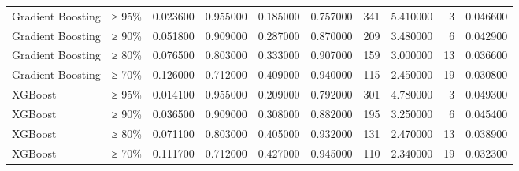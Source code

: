 \begin{table}
\begin{tabular}{llrrrrrrrr}
Gradient Boosting & ≥ 95\% & 0.023600 & 0.955000 & 0.185000 & 0.757000 & 341 & 5.410000 & 3 & 0.046600 \\
Gradient Boosting & ≥ 90\% & 0.051800 & 0.909000 & 0.287000 & 0.870000 & 209 & 3.480000 & 6 & 0.042900 \\
Gradient Boosting & ≥ 80\% & 0.076500 & 0.803000 & 0.333000 & 0.907000 & 159 & 3.000000 & 13 & 0.036600 \\
Gradient Boosting & ≥ 70\% & 0.126000 & 0.712000 & 0.409000 & 0.940000 & 115 & 2.450000 & 19 & 0.030800 \\
XGBoost & ≥ 95\% & 0.014100 & 0.955000 & 0.209000 & 0.792000 & 301 & 4.780000 & 3 & 0.049300 \\
XGBoost & ≥ 90\% & 0.036500 & 0.909000 & 0.308000 & 0.882000 & 195 & 3.250000 & 6 & 0.045400 \\
XGBoost & ≥ 80\% & 0.071100 & 0.803000 & 0.405000 & 0.932000 & 131 & 2.470000 & 13 & 0.038900 \\
XGBoost & ≥ 70\% & 0.111700 & 0.712000 & 0.427000 & 0.945000 & 110 & 2.340000 & 19 & 0.032300 \\
\bottomrule
\end{tabular}
\end{table}
